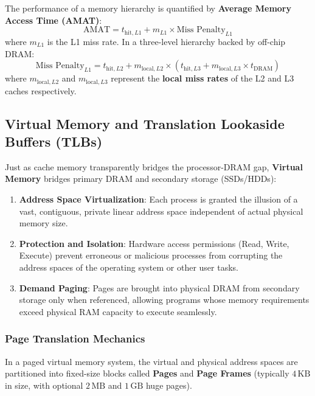 The performance of a memory hierarchy is quantified by \textbf{Average Memory Access Time (AMAT)}:
\begin{equation}
\text{AMAT} = t_{\text{hit}, L1} + m_{L1} \times \text{Miss Penalty}_{L1}
\end{equation}
where $m_{L1}$ is the L1 miss rate. In a three-level hierarchy backed by off-chip DRAM:
\begin{equation}
\text{Miss Penalty}_{L1} = t_{\text{hit}, L2} + m_{\text{local}, L2} \times \left( t_{\text{hit}, L3} + m_{\text{local}, L3} \times t_{\text{DRAM}} \right)
\end{equation}
where $m_{\text{local}, L2}$ and $m_{\text{local}, L3}$ represent the \textbf{local miss rates} of the L2 and L3 caches respectively.

\subsection{Virtual Memory and Translation Lookaside Buffers (TLBs)}\label{lb:vmm}\label{sec:virtual_memory_tlb}

Just as cache memory transparently bridges the processor-DRAM gap, \textbf{Virtual Memory} bridges primary DRAM and secondary storage (SSDs/HDDs):
\begin{enumerate}
    \item \textbf{Address Space Virtualization}: Each process is granted the illusion of a vast, contiguous, private linear address space independent of actual physical memory size.
    \item \textbf{Protection and Isolation}: Hardware access permissions (Read, Write, Execute) prevent erroneous or malicious processes from corrupting the address spaces of the operating system or other user tasks.
    \item \textbf{Demand Paging}: Pages are brought into physical DRAM from secondary storage only when referenced, allowing programs whose memory requirements exceed physical RAM capacity to execute seamlessly.
\end{enumerate}

\subsubsection{Page Translation Mechanics}
In a paged virtual memory system, the virtual and physical address spaces are partitioned into fixed-size blocks called \textbf{Pages} and \textbf{Page Frames} (typically $4\,\text{KB}$ in size, with optional $2\,\text{MB}$ and $1\,\text{GB}$ huge pages). 

